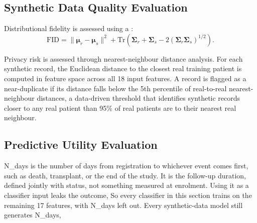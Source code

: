 \subsection{Synthetic Data Quality Evaluation}

Distributional fidelity is assessed using a :
\begin{equation}
\text{FID} = \|\boldsymbol{\mu}_r - \boldsymbol{\mu}_s\|^2 + \text{Tr}\!\left(\boldsymbol{\Sigma}_r + \boldsymbol{\Sigma}_s - 2(\boldsymbol{\Sigma}_r \boldsymbol{\Sigma}_s)^{1/2}\right).
\end{equation}

 Privacy risk is assessed through nearest-neighbour distance analysis. For each synthetic record, the Euclidean distance to the closest real training patient is computed in  feature space across all 18 input features. A record is flagged as a near-duplicate if its distance falls below the 5th percentile of real-to-real nearest-neighbour distances, a data-driven threshold that identifies synthetic records closer to any real patient than 95\% of real patients are to their nearest real neighbour.

\subsection{Predictive Utility Evaluation}
\label{sec:predutil}

N\_days is the number of days from registration to whichever event comes first, such as death, transplant, or the end of the study. It is the follow-up duration, defined jointly with status, not something measured at enrolment. Using it as a classifier input leaks the outcome,  So every classifier in this section trains on the remaining 17 features, with N\_days left out. Every synthetic-data model still generates N\_days, 


